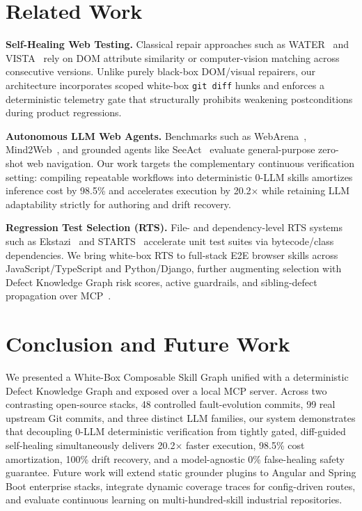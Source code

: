 \documentclass[conference]{IEEEtran}
\begin{document}
\section{Related Work}
\textbf{Self-Healing Web Testing.} Classical repair approaches such as WATER~\cite{choudhary2011water} and VISTA~\cite{stocco2018vista} rely on DOM attribute similarity or computer-vision matching across consecutive versions. Unlike purely black-box DOM/visual repairers, our architecture incorporates scoped white-box \texttt{git diff} hunks and enforces a deterministic telemetry gate that structurally prohibits weakening postconditions during product regressions.

\textbf{Autonomous LLM Web Agents.} Benchmarks such as WebArena~\cite{zhou2024webarena}, Mind2Web~\cite{deng2023mind2web}, and grounded agents like SeeAct~\cite{zheng2024seeact} evaluate general-purpose zero-shot web navigation. Our work targets the complementary continuous verification setting: compiling repeatable workflows into deterministic 0-LLM skills amortizes inference cost by 98.5\% and accelerates execution by 20.2$\times$ while retaining LLM adaptability strictly for authoring and drift recovery.

\textbf{Regression Test Selection (RTS).} File- and dependency-level RTS systems such as Ekstazi~\cite{gligoric2015ekstazi} and STARTS~\cite{legunsen2017starts} accelerate unit test suites via bytecode/class dependencies. We bring white-box RTS to full-stack E2E browser skills across JavaScript/TypeScript and Python/Django, further augmenting selection with Defect Knowledge Graph risk scores, active guardrails, and sibling-defect propagation over MCP~\cite{mcp2024}.

\section{Conclusion and Future Work}
We presented a White-Box Composable Skill Graph unified with a deterministic Defect Knowledge Graph and exposed over a local MCP server. Across two contrasting open-source stacks, 48 controlled fault-evolution commits, 99 real upstream Git commits, and three distinct LLM families, our system demonstrates that decoupling 0-LLM deterministic verification from tightly gated, diff-guided self-healing simultaneously delivers 20.2$\times$ faster execution, 98.5\% cost amortization, 100\% drift recovery, and a model-agnostic 0\% false-healing safety guarantee. Future work will extend static grounder plugins to Angular and Spring Boot enterprise stacks, integrate dynamic coverage traces for config-driven routes, and evaluate continuous learning on multi-hundred-skill industrial repositories.

\balance


\end{document}

